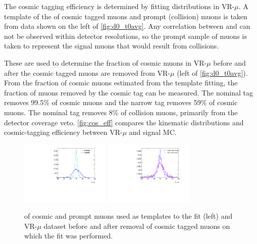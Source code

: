 The cosmic tagging efficiency is determined by fitting distributions in VR-$\mu$. A template of the \tavg of cosmic tagged muons and prompt (collision) muons is taken from data shown on the left of \autoref{fig:d0_t0avg}. Any correlation between \tavg and \dz can not be observed within detector resolutions, so the prompt sample of muons is taken to represent the signal muons that would result from collisions.

These are used to determine the fraction of cosmic muons in VR-$\mu$ before and after the cosmic tagged muons are removed from VR-$\mu$ (left of \autoref{fig:d0_t0avg}). From the fraction of cosmic muons estimated from the template fitting, the fraction of muons removed by the cosmic tag can be measured. The nominal tag removes 99.5\% of cosmic muons and the narrow tag removes 59\% of cosmic muons. The nominal tag removes 8\% of collision muons, primarily from the detector coverage veto. \autoref{fig:cos_eff} compares the kinematic distributions and cosmic-tagging efficiency between VR-$\mu$ and signal \ac{MC}. 

\begin{figure}[!ht]
  \centering
  \includegraphics[width=0.38\textwidth]{figures/cosmics/t0_avg_template_comp.pdf}
  \includegraphics[width=0.38\textwidth]{figures/cosmics/t0_avg_prepost_comp.pdf}
  \caption{\tavg of cosmic and prompt muons used as templates to the fit (left) and VR-$\mu$ dataset before and after removal of cosmic tagged muons on which the fit was performed.}
  \label{fig:d0_t0avg}
\end{figure}


